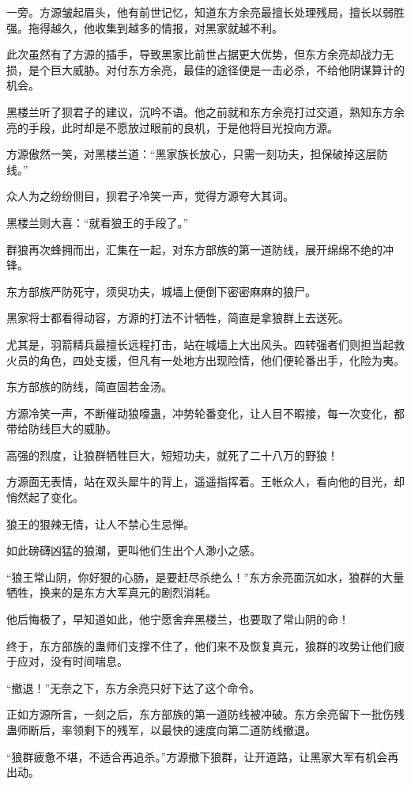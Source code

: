 \begin{this_body}
一旁。方源皱起眉头，他有前世记忆，知道东方余亮最擅长处理残局，擅长以弱胜强。拖得越久，他收集到越多的情报，对黑家就越不利。

此次虽然有了方源的插手，导致黑家比前世占据更大优势，但东方余亮却战力无损，是个巨大威胁。对付东方余亮，最佳的途径便是一击必杀，不给他阴谋算计的机会。

黑楼兰听了狈君子的建议，沉吟不语。他之前就和东方余亮打过交道，熟知东方余亮的手段，此时却是不愿放过眼前的良机，于是他将目光投向方源。

方源傲然一笑，对黑楼兰道：“黑家族长放心，只需一刻功夫，担保破掉这层防线。”

众人为之纷纷侧目，狈君子冷笑一声，觉得方源夸大其词。

黑楼兰则大喜：“就看狼王的手段了。”

群狼再次蜂拥而出，汇集在一起，对东方部族的第一道防线，展开绵绵不绝的冲锋。

东方部族严防死守，须臾功夫，城墙上便倒下密密麻麻的狼尸。

黑家将士都看得动容，方源的打法不计牺牲，简直是拿狼群上去送死。

尤其是，羽箭精兵最擅长远程打击，站在城墙上大出风头。四转强者们则担当起救火员的角色，四处支援，但凡有一处地方出现险情，他们便轮番出手，化险为夷。

东方部族的防线，简直固若金汤。

方源冷笑一声，不断催动狼嚎蛊，冲势轮番变化，让人目不暇接，每一次变化，都带给防线巨大的威胁。

高强的烈度，让狼群牺牲巨大，短短功夫，就死了二十八万的野狼！

方源面无表情，站在双头犀牛的背上，遥遥指挥着。王帐众人，看向他的目光，却悄然起了变化。

狼王的狠辣无情，让人不禁心生忌惮。

如此磅礴凶猛的狼潮，更叫他们生出个人渺小之感。

“狼王常山阴，你好狠的心肠，是要赶尽杀绝么！”东方余亮面沉如水，狼群的大量牺牲，换来的是东方大军真元的剧烈消耗。

他后悔极了，早知道如此，他宁愿舍弃黑楼兰，也要取了常山阴的命！

终于，东方部族的蛊师们支撑不住了，他们来不及恢复真元，狼群的攻势让他们疲于应对，没有时间喘息。

“撤退！”无奈之下，东方余亮只好下达了这个命令。

正如方源所言，一刻之后，东方部族的第一道防线被冲破。东方余亮留下一批伤残蛊师断后，率领剩下的残军，以最快的速度向第二道防线撤退。

“狼群疲惫不堪，不适合再追杀。”方源撤下狼群，让开道路，让黑家大军有机会再出动。


\end{this_body}
